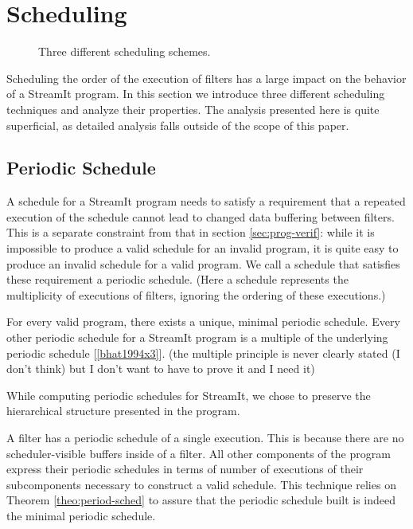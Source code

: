\section{Scheduling}

\begin{figure}
\centering
{}
\caption{Three different scheduling schemes.}
\label{fig:sched}

\end{figure}

Scheduling the order of the execution of filters has a large impact on 
the behavior of a StreamIt program.  In this section we introduce three
different scheduling techniques and analyze their properties.  The analysis
presented here is quite superficial, as detailed analysis falls outside of
the scope of this paper.

\subsection{Periodic Schedule}
A schedule for a StreamIt program needs to satisfy a requirement that
a repeated execution of the schedule cannot lead to changed data buffering
between filters.  This is a separate constraint from that in section
\ref{sec:prog-verif}:  while it is impossible to produce a valid schedule
for an invalid program, it is quite easy to produce an invalid schedule for
a valid program.  We call a schedule that satisfies these requirement a
periodic schedule.  (Here a schedule represents the multiplicity of executions
of filters, ignoring the ordering of these executions.)

\begin{theorem}
\label{theo:period-sched}
For every valid program, there exists a unique, minimal periodic schedule.
Every other periodic schedule for a StreamIt program is a multiple of the
underlying periodic schedule [\ref{bhat1994x3}].  (the multiple principle
is never clearly stated (I don't think) but I don't want to have to prove
it and I need it)
\end{theorem}

While computing periodic schedules for StreamIt, we chose to preserve the
hierarchical structure presented in the program.

A filter has a periodic schedule of a single execution.  This is because
there are no scheduler-visible buffers inside of a filter.  All other
components of the program express their periodic schedules in terms of
number of executions of their subcomponents necessary to construct a valid
schedule.  This technique relies on Theorem \ref{theo:period-sched} to
assure that the periodic schedule built is indeed the minimal periodic
schedule.

